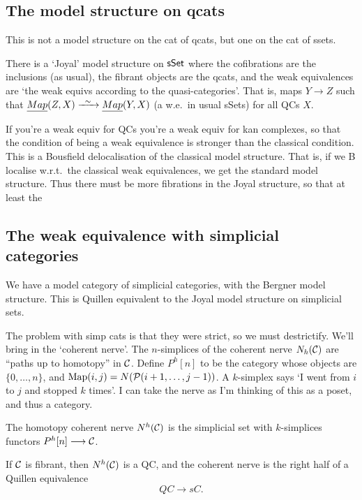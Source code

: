 \begin{SaulInftyOneCats}
\subsection*{The model structure on qcats}
This is not a model structure on the cat of qcats, but one on the cat of ssets.
\begin{thm*}[Thmdef]
There is a  `Joyal' model structure on $\operatorname{{\mathsf{sSet}}}$ where the cofibrations are the inclusions (as usual), the fibrant objects are the qcats, and the weak equivalences are `the weak equivs according to the quasi-categories'. That is, maps $Y\to  Z$ such that $\underline{Map}(Z,X)\weakequiv\underline{Map}(Y,X)$ (a w.e.\ in usual sSets) for all QCs $X$.
\end{thm*}
If you're a weak equiv for QCs you're a weak equiv for kan complexes, so that the condition of being a weak equivalence is stronger than the classical condition. This is a Bousfield delocalisation of the classical model structure. That is, if we B localise w.r.t.\ the classical weak equivalences, we get the standard model structure. Thus there must be more fibrations in the Joyal structure, so that at least the 
\subsection*{The weak equivalence with simplicial categories}
We have a model category of simplicial categories, with the Bergner model structure. This is Quillen equivalent to the Joyal model structure on simplicial sets.

The problem with simp cats is that they were strict, so we must destrictify. We'll bring in the `coherent nerve'. The $n$-simplices of the coherent nerve $N_h(\mathcal{C})$ are ``paths up to homotopy'' in $\mathcal{C}$. Define $P^h[n]$ to be the category whose objects are $\{0,\ldots,n\}$, and $\operatorname{Map}(i,j)=N(\mathcal{P}(i+1,\ldots,j-1))$. A $k$-simplex says `I went from $i$ to $j$ and stopped $k$ times'. I can take the nerve as I'm thinking of this as a poset, and thus a category.

The homotopy coherent nerve $N^h(\mathcal{C})$ is the simplicial set with $k$-simplices functors $P^h[n]\longrightarrow\mathcal{C}$.
\begin{thm*}
If $\mathcal{C}$ is fibrant, then $N^h(\mathcal{C})$ is a QC, and the coherent nerve is the right half of a Quillen equivalence
\[QC\to sC.\]
\end{thm*}


\pagebreak
\end{SaulInftyOneCats}
